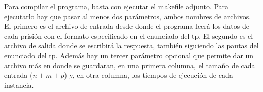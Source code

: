 Para compilar el programa, basta con ejecutar el makefile adjunto. Para ejecutarlo hay que pasar al menos dos parámetros, ambos nombres de archivos. El primero es el archivo de entrada desde donde el programa leerá los datos de cada prisión con el formato especificado en el enunciado del tp. El segundo es el archivo de salida donde se escribirá la respuesta, también siguiendo las pautas del enunciado del tp.
Además hay un tercer parámetro opcional que permite dar un archivo más en donde se guardaran, en una primera columna, el tamaño de cada entrada ($n+m+p$) y, en otra columna, los tiempos de ejecución de cada instancia.